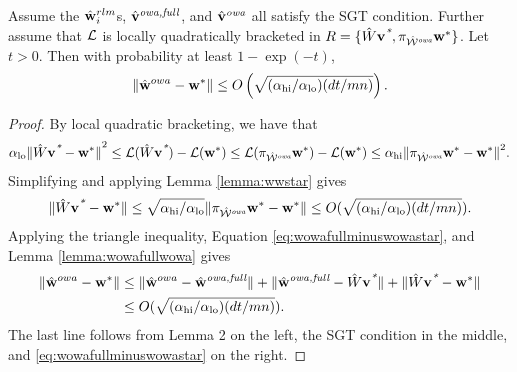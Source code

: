 \documentclass[thesis.tex]{subfiles}
\newcommand{\qhi}{\alpha_\text{hi}}
\newcommand{\qlo}{\alpha_\text{lo}}
\begin{document}
\begin{theorem}
\label{theorem:wowafull}
Assume the $\hat{\mathbf w}^{rlm}_i$s, $\hat{\mathbf{v}}^{\textit{owa,full}}$, and $\hat{\mathbf{v}}^{\textit{owa}}$ all satisfy the SGT condition.
Further assume that $\mathcal{L}$ is locally quadratically bracketed in $R=\{\hat W\mathbf{v}^{\textit{*}},\pi_{{{\hat {{\mathcal W}}^{\textit{owa}}}}}{\mathbf w^{*}}\}$.
Let $t>0$.
Then with probability at least $1-\exp(-t)$, 
\begin{equation}
    \label{eq:thm2}
\ltwo{\wowa-\wstar} \le O\left(
\sqrt{({\qhi}/{\qlo})({dt}/{mn})}
\right)
.
\end{equation}
\end{theorem}

\begin{proof}
By local quadratic bracketing, we have that
\begin{align*}
\qlo\ltwo{\matW\vstar-\wstar}^2
\le
\Loss(\matW\vstar) - \Loss(\wstar)
\le
\Loss(\proj{\Wowa}\wstar) - \Loss(\wstar)
\le
\qhi\ltwo{\proj{\Wowa}\wstar-\wstar}^2
.
\end{align*}
Simplifying and applying Lemma \ref{lemma:wwstar} gives
\begin{equation}
    \label{eq:wowafullminuswowastar}
\ltwo{\matW\vstar-\wstar} 
\le \sqrt{{\qhi}/{\qlo}}\ltwo{\proj{\Wowa}\wstar-\wstar}
\le O(\sqrt{(\qhi/\qlo)(dt/mn)})
.
\end{equation}
Applying the triangle inequality, Equation \eqref{eq:wowafullminuswowastar}, and Lemma \ref{lemma:wowafullwowa} gives
\begin{align}
    \ltwo{\wowa-\wstar}
    &\le
    \ltwo{\wowa-\wowafull}+\ltwo{\wowafull-\matW\vstar}+\ltwo{\matW\vstar-\wstar}
    \\&\le
    O(\sqrt{(\qhi/\qlo)(dt/mn)})
    .
\end{align}
The last line follows from Lemma 2 on the left, the SGT condition%
in the middle,
and \eqref{eq:wowafullminuswowastar} on the right.
\end{proof}
\end{document}
